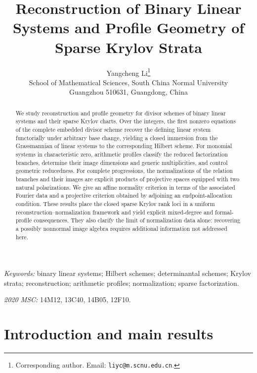 \documentclass[10pt,fleqn]{article}
\numberwithin{equation}{section}
\begin{document}
\title{Reconstruction of Binary Linear Systems and Profile Geometry of Sparse Krylov Strata}
\author{Yangcheng Li\thanks{Corresponding author. Email: \texttt{liyc@m.scnu.edu.cn}.}\\[3pt]
\small School of Mathematical Sciences, South China Normal University\\
\small Guangzhou 510631, Guangdong, China}
\date{}
\maketitle
\begin{abstract}
We study reconstruction and profile geometry for divisor schemes of binary
linear systems and their sparse Krylov charts.  Over the integers, the first
nonzero equations of the complete embedded divisor scheme recover the
defining linear system functorially under arbitrary base change, yielding a
closed immersion from the Grassmannian of linear systems to the corresponding
Hilbert scheme.  For monomial systems in characteristic zero, arithmetic
profiles classify the reduced factorization branches, determine their image
dimensions and generic multiplicities, and control geometric reducedness.
For complete progressions, the normalizations of the relation branches and
their images are explicit products of projective spaces equipped with two
natural polarizations.  We give an affine normality criterion in terms of the
associated Fourier data and a projective criterion obtained by adjoining an
endpoint-allocation condition.  These results place the closed sparse
Krylov rank loci in a uniform reconstruction--normalization framework and
yield explicit mixed-degree and formal-profile consequences.  They also
clarify the limit of normalization data alone: recovering a possibly
nonnormal image algebra requires additional information not addressed here.
\end{abstract}
\noindent\textit{Keywords:} binary linear systems; Hilbert schemes; determinantal schemes;
Krylov strata; reconstruction; arithmetic profiles; normalization; sparse factorization.

\noindent\textit{2020 MSC:} 14M12, 13C40, 14B05, 12F10.

\section{Introduction and main results}\label{sec:introduction}
\end{document}
